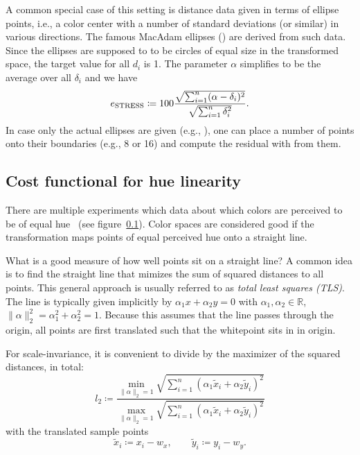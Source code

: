 \documentclass{scrartcl}
\theoremstyle{named}
\newcommand\R{\ensuremath{\mathbb{R}}}
\begin{document}
A common special case of this setting is distance data given in terms of ellipse points,
i.e., a color center with a number of standard deviations (or similar) in various
directions. The famous MacAdam ellipses (\cite{macadam1942}) are derived from such data.
Since the ellipses are supposed to to be circles of equal size in the transformed space,
the target value for all $d_i$ is 1. The parameter $\alpha$ simplifies to be the average
over all $\delta_i$ and we have
\begin{equation}\label{eq:e}
  e_{\text{STRESS}}
  \coloneqq
  100
  \frac{%
    \sqrt{\sum_{i=1}^n (\alpha - \delta_{i})^2}
  }{
    \sqrt{\sum_{i=1}^n \delta_i^2}
  }.
\end{equation}
In case only the actual ellipses are given (e.g., \cite{luorigg}), one can place a
number of points onto their boundaries (e.g., 8 or 16) and compute the residual with
from them.

\subsection{Cost functional for hue linearity}

There are multiple experiments which data about which colors are perceived to be of
equal hue~\cite{hung,ebner,xiao} (see figure~\ref{}). Color spaces are considered good
if the transformation maps points of equal perceived hue onto a straight line.

What is a good measure of how well points sit on a straight line?
A common idea is to find the straight line that mimizes the sum of squared distances to
all points. This general approach is usually referred to as \emph{total least squares
(TLS)}.
The line is typically
given implicitly by $\alpha_1 x + \alpha_2 y
= 0$ with $\alpha_1,\alpha_2\in\R$, $\|\alpha\|_2^2 = \alpha_1^2 + \alpha_2^2 = 1$.
Because this assumes that the line passes through the origin, all points are
first translated such that the whitepoint sits in in origin.

For scale-invariance, it is convenient to divide by the maximizer of the squared
distances, in total:
\begin{equation}\label{eq:l}
l_2 \coloneqq
  \frac{
\min_{\|\alpha\|_2=1}
  \sqrt{\sum_{i=1}^n (\alpha_1 \tilde{x}_i + \alpha_2 \tilde{y}_i)^2}
}{
\max_{\|\alpha\|_2=1}
  \sqrt{\sum_{i=1}^n (\alpha_1 \tilde{x}_i + \alpha_2 \tilde{y}_i)^2}
}
\end{equation}
with the translated sample points
\[
  \tilde{x}_i \coloneqq x_i-w_x,\qquad
  \tilde{y}_i \coloneqq y_i-w_y.
\]
\end{document}
